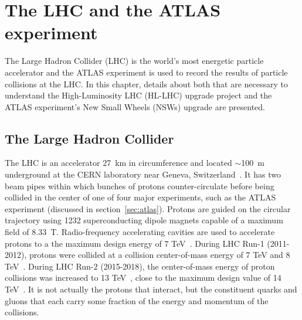 
\chapter{The LHC and the ATLAS experiment}
\label{chap:lhc_atlas}

The Large Hadron Collider (LHC) is the world's most energetic particle accelerator and the ATLAS experiment is used to record the results of particle collisions at the LHC. In this chapter, details about both that are necessary to understand the High-Luminosity LHC (HL-LHC) upgrade project and the ATLAS experiment's New Small Wheels (NSWs) upgrade are presented.

\section{The Large Hadron Collider}

The LHC is an accelerator \SI{27}{\kilo\meter} in circumference and located $\sim$\SI{100}{\meter} underground at the CERN laboratory near Geneva, Switzerland~\cite{evans_lhc_2008}. It has two beam pipes within which bunches of protons counter-circulate before being collided in the center of one of four major experiments, such as the ATLAS experiment (discussed in section~\ref{sec:atlas}). Protons are guided on the circular trajectory using 1232 superconducting dipole magnets capable of a maximum field of \SI{8.33}{T}. Radio-frequency accelerating cavities are used to accelerate protons to a the maximum design energy of 7 TeV~\cite{bruning_lhc_2004}.  During LHC Run-1 (2011-2012), protons were collided at a collision center-of-mass energy of 7 TeV and 8 TeV~\cite{atlas_luminosity_run1}. During LHC Run-2 (2015-2018), the center-of-mass energy of proton collisions was increased to 13 TeV~\cite{atlas_luminosity_run2}, close to the maximum design value of 14 TeV~\cite{bruning_lhc_2004}. It is not actually the protons that interact, but the constituent quarks and gluons that each carry some fraction of the energy and momentum of the collisions.


